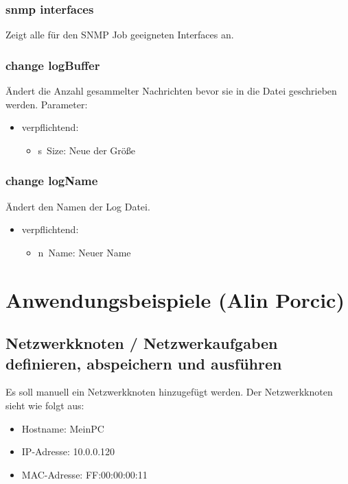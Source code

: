 \documentclass[12pt,a4paper]{report}
\begin{document}
\begin{onehalfspace}
\subsubsection{snmp interfaces}

Zeigt alle für den SNMP Job geeigneten Interfaces an.

\subsubsection{change logBuffer}

Ändert die Anzahl gesammelter Nachrichten bevor sie in die Datei geschrieben werden.
Parameter:\\
\begin{itemize}
\item verpflichtend:
\begin{itemize}
\item \glqq s\grqq \ Size: Neue der Größe
\end{itemize}
\end{itemize}

\subsubsection{change logName}

Ändert den Namen der Log Datei.

\begin{itemize}
\item verpflichtend:
\begin{itemize}
\item \glqq n\grqq \ Name: Neuer Name
\end{itemize}
\end{itemize}

\newpage
{}
\section{Anwendungsbeispiele (Alin Porcic)}

\subsection{Netzwerkknoten / Netzwerkaufgaben definieren, abspeichern und ausführen}

Es soll manuell ein Netzwerkknoten hinzugefügt werden. Der Netzwerkknoten sieht wie folgt aus:

\begin{itemize}
  \item Hostname: MeinPC
  \item IP-Adresse: 10.0.0.120
  \item MAC-Adresse: FF:00:00:00:11
\end{itemize}


\end{onehalfspace}
\end{document}
